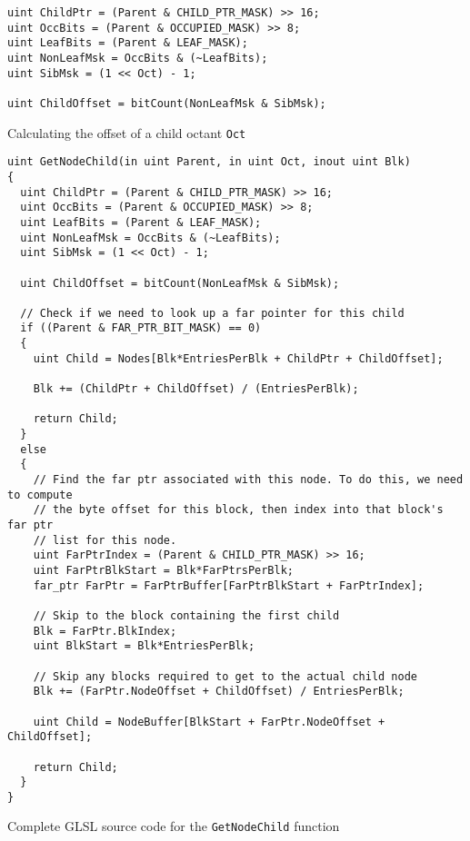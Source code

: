 \begin{listing}[ht]
\small
\linespread{0.80}
\selectfont
\begin{verbatim}
uint ChildPtr = (Parent & CHILD_PTR_MASK) >> 16;
uint OccBits = (Parent & OCCUPIED_MASK) >> 8; 
uint LeafBits = (Parent & LEAF_MASK);
uint NonLeafMsk = OccBits & (~LeafBits);
uint SibMsk = (1 << Oct) - 1;

uint ChildOffset = bitCount(NonLeafMsk & SibMsk); 
\end{verbatim}
\caption{Calculating the offset of a child octant \texttt{Oct}}
\label{listing:calculatechildoffset_src}
\end{listing}


\begin{listing}[ht]
\small
\linespread{0.80}
\selectfont
\begin{verbatim}
uint GetNodeChild(in uint Parent, in uint Oct, inout uint Blk)
{
  uint ChildPtr = (Parent & CHILD_PTR_MASK) >> 16;
  uint OccBits = (Parent & OCCUPIED_MASK) >> 8; 
  uint LeafBits = (Parent & LEAF_MASK);
  uint NonLeafMsk = OccBits & (~LeafBits);
  uint SibMsk = (1 << Oct) - 1;

  uint ChildOffset = bitCount(NonLeafMsk & SibMsk); 

  // Check if we need to look up a far pointer for this child
  if ((Parent & FAR_PTR_BIT_MASK) == 0)
  {
    uint Child = Nodes[Blk*EntriesPerBlk + ChildPtr + ChildOffset];
    
    Blk += (ChildPtr + ChildOffset) / (EntriesPerBlk);

    return Child;
  }
  else
  {
    // Find the far ptr associated with this node. To do this, we need to compute
    // the byte offset for this block, then index into that block's far ptr
    // list for this node.
    uint FarPtrIndex = (Parent & CHILD_PTR_MASK) >> 16;
    uint FarPtrBlkStart = Blk*FarPtrsPerBlk;
    far_ptr FarPtr = FarPtrBuffer[FarPtrBlkStart + FarPtrIndex];

    // Skip to the block containing the first child
    Blk = FarPtr.BlkIndex;
    uint BlkStart = Blk*EntriesPerBlk;

    // Skip any blocks required to get to the actual child node
    Blk += (FarPtr.NodeOffset + ChildOffset) / EntriesPerBlk;

    uint Child = NodeBuffer[BlkStart + FarPtr.NodeOffset + ChildOffset];

    return Child;
  }
}

\end{verbatim}
\caption{Complete GLSL source code for the \texttt{GetNodeChild} function}
\label{listing:getnodechild_src}
\end{listing}

